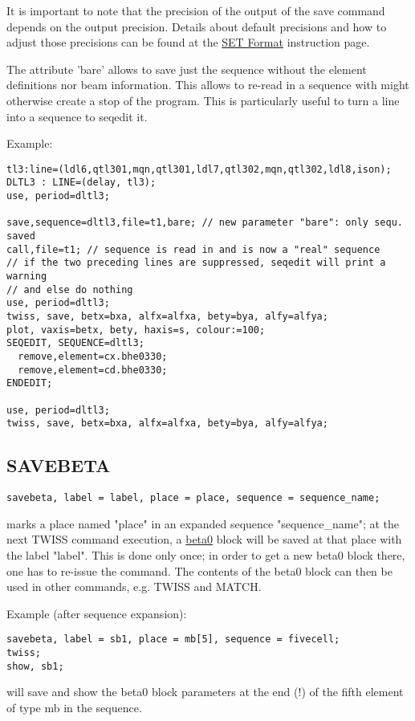 It is important to note that the precision of the output of the save
command depends on the output precision. Details about default
precisions and how to adjust those precisions can be found at the
\href{../Introduction/set.html#Format}{SET Format} instruction page.   
 
The attribute 'bare' allows to save just the sequence without the
element definitions nor beam information. This allows to re-read in a
sequence with might otherwise create a stop of the program. This is
particularly useful to turn a line into a sequence to seqedit
it. 

Example:  
\begin{verbatim}
tl3:line=(ldl6,qtl301,mqn,qtl301,ldl7,qtl302,mqn,qtl302,ldl8,ison);
DLTL3 : LINE=(delay, tl3);
use, period=dltl3;

save,sequence=dltl3,file=t1,bare; // new parameter "bare": only sequ. saved
call,file=t1; // sequence is read in and is now a "real" sequence
// if the two preceding lines are suppressed, seqedit will print a warning
// and else do nothing
use, period=dltl3;
twiss, save, betx=bxa, alfx=alfxa, bety=bya, alfy=alfya;
plot, vaxis=betx, bety, haxis=s, colour:=100;
SEQEDIT, SEQUENCE=dltl3;
  remove,element=cx.bhe0330;
  remove,element=cd.bhe0330;
ENDEDIT;

use, period=dltl3;
twiss, save, betx=bxa, alfx=alfxa, bety=bya, alfy=alfya;
\end{verbatim}


\subsection{SAVEBETA}
\label{subsec:general_savebeta}
\begin{verbatim}
savebeta, label = label, place = place, sequence = sequence_name;
\end{verbatim} 
marks a place named "place" in an expanded sequence "sequence\_name"; 
at the next TWISS command execution, a
\href{../twiss/twiss.html#beta0}{beta0} 
block will be saved at that place with the label "label". This is done
only once; in order to get a new beta0 block there, one has to re-issue
the command. The contents of the beta0 block can then be used in other
commands, e.g. TWISS and MATCH.  

Example (after sequence expansion): 
\begin{verbatim}
savebeta, label = sb1, place = mb[5], sequence = fivecell;
twiss;
show, sb1;
\end{verbatim} 
will save and show the beta0 block parameters at the end (!) of the
fifth element of type mb in the sequence.  


